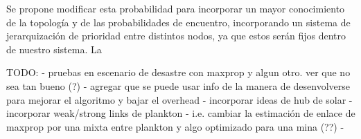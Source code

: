 \documentclass[10pt,preprint,onecolumn]{article}
\begin{document}
Se propone modificar esta probabilidad para incorporar un mayor conocimiento de la topología y de las probabilidades de encuentro, incorporando un sistema de jerarquización de prioridad entre distintos nodos, ya que estos serán fijos dentro de nuestro sistema. La 


TODO:
- pruebas en escenario de desastre con maxprop y algun otro. ver que no sea tan bueno (?)
- agregar que se puede usar info de la manera de desenvolverse para mejorar el algoritmo y bajar el overhead - incorporar ideas de hub de solar
- incorporar weak/strong links de plankton
- i.e. cambiar la estimación de enlace de maxprop por una mixta entre plankton y algo optimizado para una mina (??)
- 

\newpage


\end{document}
